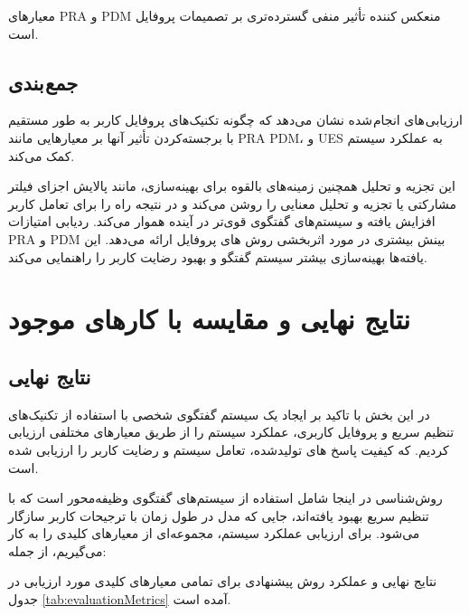 معیارهای PRA و PDM منعکس کننده تأثیر منفی گسترده‌تری بر تصمیمات پروفایل است.




\subsection{جمع بندی}
ارزیابی های انجام شده نشان می‌دهد که چگونه تکنیک‌های پروفایل کاربر به طور مستقیم با برجسته‌کردن تأثیر آنها بر معیارهایی مانند PRA PDM، و UES به عملکرد سیستم کمک می‌کند. 

این تجزیه و تحلیل همچنین زمینه‌های بالقوه برای بهینه‌سازی، مانند پالایش اجزای فیلتر مشارکتی یا تجزیه و تحلیل معنایی را روشن می‌کند و در نتیجه راه را برای تعامل کاربر افزایش‌ یافته و سیستم‌های گفتگوی قوی‌تر در آینده هموار می‌کند. ردیابی امتیازات PRA و PDM بینش بیشتری در مورد اثربخشی روش های پروفایل ارائه می‌دهد. این یافته‌ها بهینه‌سازی بیشتر سیستم گفتگو و بهبود رضایت کاربر را راهنمایی می‌کند.

\section{نتایج نهایی و مقایسه با کارهای موجود}

\subsection{نتایج نهایی}
در این بخش با تاکید بر ایجاد یک سیستم گفتگوی شخصی با استفاده از تکنیک‌های تنظیم سریع و پروفایل کاربری، عملکرد سیستم را از طریق معیارهای مختلفی ارزیابی کردیم. که کیفیت پاسخ های تولید‌شده، تعامل سیستم و رضایت کاربر را ارزیابی شده است. 

روش‌شناسی در اینجا شامل استفاده از سیستم‌های گفتگوی وظیفه‌محور است که با تنظیم سریع بهبود یافته‌اند، جایی که مدل در طول زمان با ترجیحات کاربر سازگار می‌شود. برای ارزیابی عملکرد سیستم، مجموعه‌ای از معیارهای کلیدی را به کار می‌گیریم، از جمله:

نتایج نهایی و عملکرد روش پیشنهادی برای تمامی معیارهای کلیدی مورد ارزیابی در جدول%
\ref{tab:evaluationMetrics}
آمده است.

